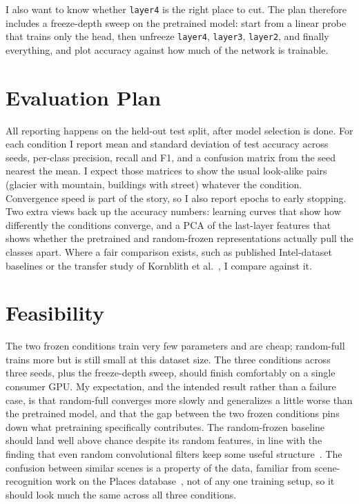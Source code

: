 \documentclass[conference]{IEEEtran}
\begin{document}
I also want to know whether \texttt{layer4} is the right place to cut. The plan therefore includes a freeze-depth sweep on the pretrained model: start from a linear probe that trains only the head, then unfreeze \texttt{layer4}, \texttt{layer3}, \texttt{layer2}, and finally everything, and plot accuracy against how much of the network is trainable.

\section{Evaluation Plan}
All reporting happens on the held-out test split, after model selection is done. For each condition I report mean and standard deviation of test accuracy across seeds, per-class precision, recall and F1, and a confusion matrix from the seed nearest the mean. I expect those matrices to show the usual look-alike pairs (glacier with mountain, buildings with street) whatever the condition. Convergence speed is part of the story, so I also report epochs to early stopping. Two extra views back up the accuracy numbers: learning curves that show how differently the conditions converge, and a PCA of the last-layer features that shows whether the pretrained and random-frozen representations actually pull the classes apart. Where a fair comparison exists, such as published Intel-dataset baselines or the transfer study of Kornblith et al.~\cite{kornblith2019better}, I compare against it.

\section{Feasibility}
The two frozen conditions train very few parameters and are cheap; random-full trains more but is still small at this dataset size. The three conditions across three seeds, plus the freeze-depth sweep, should finish comfortably on a single consumer GPU. My expectation, and the intended result rather than a failure case, is that random-full converges more slowly and generalizes a little worse than the pretrained model, and that the gap between the two frozen conditions pins down what pretraining specifically contributes. The random-frozen baseline should land well above chance despite its random features, in line with the finding that even random convolutional filters keep some useful structure~\cite{saxe2011random}. The confusion between similar scenes is a property of the data, familiar from scene-recognition work on the Places database~\cite{zhou2014places}, not of any one training setup, so it should look much the same across all three conditions.
\end{document}
